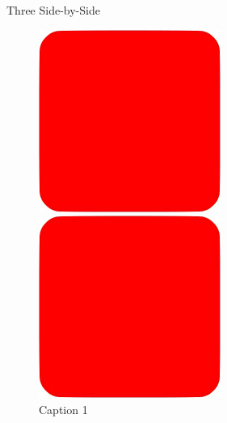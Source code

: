 \begin{frame}{Three Side-by-Side}
\begin{figure}
    \centering
    \begin{minipage}{0.32\textwidth}
        \centering
        \includegraphics[width=\linewidth]{assets/placeholder.png} %
        \caption{Caption 1}
    \end{minipage}\hfill
    \begin{minipage}{0.32\textwidth}
        \centering
        \includegraphics[width=\linewidth]{assets/placeholder.png} %

\end{minipage}
\end{figure}
\end{frame}
